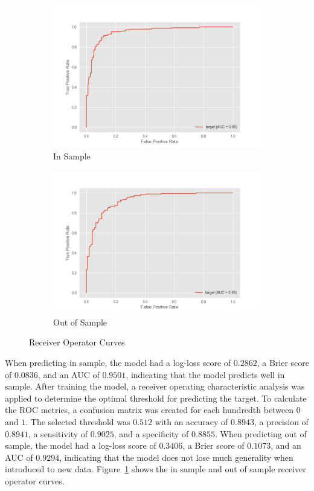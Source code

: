 \begin{figure}[!tp]
    \centering
    \begin{subfigure}[b]{0.49\textwidth}
        \centering
        \includegraphics[width=\textwidth]{plots/roc-is-1.png}
        \caption{In Sample}
    \end{subfigure}
    \begin{subfigure}[b]{0.49\textwidth}
        \centering
        \includegraphics[width=\textwidth]{plots/roc-oos-1.png}
        \caption{Out of Sample}
    \end{subfigure}
    \caption{Receiver Operator Curves}\label{fig:roc}
\end{figure}
When predicting in sample, the model had a log-loss score of $0.2862$, a Brier score of $0.0836$, and an AUC of $0.9501$, indicating that the model predicts well in sample. 
After training the model, a receiver operating characteristic analysis was applied to determine the optimal threshold for predicting the target. 
To calculate the ROC metrics, a confusion matrix was created for each hundredth between $0$ and $1$. 
The selected threshold was $0.512$ with an accuracy of $0.8943$, a precision of $0.8941$, a sensitivity of $0.9025$, and a specificity of $0.8855$.
When predicting out of sample, the model had a log-loss score of $0.3406$, a Brier score of $0.1073$, and an AUC of $0.9294$, indicating that the model does not lose much generality when introduced to new data. 
Figure~\ref{fig:roc} shows the in sample and out of sample receiver operator curves.


